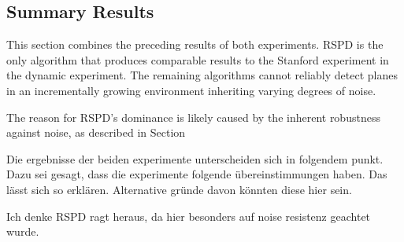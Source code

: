 \documentclass[main.tex]{subfiles}
\begin{document}
\subsection{Summary Results}
This section combines the preceding results of both experiments.
RSPD is the only algorithm that produces comparable results to the Stanford experiment in the dynamic experiment.
The remaining algorithms cannot reliably detect planes in an incrementally growing environment inheriting varying degrees of noise.

The reason for RSPD's dominance is likely caused by the inherent robustness against noise, as described in Section~

Die ergebnisse der beiden experimente unterscheiden sich in folgendem punkt. Dazu sei gesagt, dass die experimente folgende übereinstimmungen haben.
Das lässt sich so erklären. Alternative gründe davon könnten diese hier sein.

Ich denke RSPD ragt heraus, da hier besonders auf noise resistenz geachtet wurde. %
\end{document}
